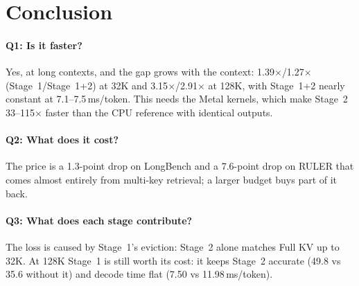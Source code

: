 \documentclass[10pt,letterpaper]{article}
\begin{document}
\section{Conclusion}
\paragraph{Q1: Is it faster?} Yes, at long contexts, and the gap grows with the context: 1.39$\times$/1.27$\times$ (Stage~1/Stage~1+2) at 32K and 3.15$\times$/2.91$\times$ at 128K, with Stage~1+2 nearly constant at 7.1--7.5\,ms/token. This needs the Metal kernels, which make Stage~2 33--115$\times$ faster than the CPU reference with identical outputs.

\paragraph{Q2: What does it cost?} The price is a 1.3-point drop on LongBench and a 7.6-point drop on RULER that comes almost entirely from multi-key retrieval; a larger budget buys part of it back.

\paragraph{Q3: What does each stage contribute?} The loss is caused by Stage~1's eviction: Stage~2 alone matches Full KV up to 32K. At 128K Stage~1 is still worth its cost: it keeps Stage~2 accurate (49.8 vs 35.6 without it) and decode time flat (7.50 vs 11.98\,ms/token).
\end{document}
